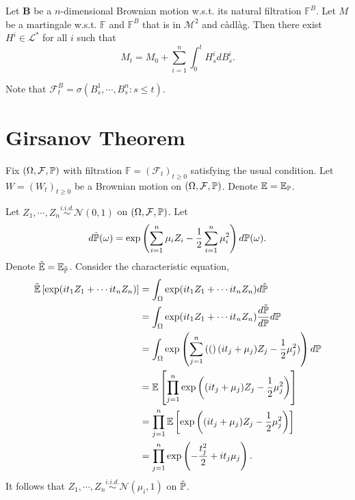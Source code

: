 \begin{thm}
    Let $\bm{B}$ be a $n$-dimensional Brownian motion w.s.t. its natural filtration $\mathbb{F}^B$. Let $M$ be a martingale w.s.t. $\mathbb{F}$ and $\mathbb{F}^B$ that is in $\mathcal{M}^2$ and c\`adl\`ag. Then there exist $H^i \in \mathcal{L}^*$ for all $i$ such that
    \begin{equation*}
        M_t = M_0 + \sum_{i=1}^n\int_0^t H_s^i dB^i_s.
    \end{equation*}
\end{thm}
\begin{rmk}
   Note that $\mathcal{F}^B_t = \sigma(B^1_s,\cdots,B^n_s \colon s \leq t)$. 
\end{rmk}

\section{Girsanov Theorem}
Fix $(\Omega,\mathcal{F},\mathbb{P})$ with filtration $\mathbb{F} = (\mathcal{F}_t)_{t \geq 0}$ satisfying the usual condition. Let $W=(W_t)_{t \geq 0}$ be a Brownian motion on $(\Omega,\mathcal{F},\mathbb{P})$. Denote $\mathbb{E} = \mathbb{E}_{\mathbb{P}}$.

\begin{exam}
    Let $Z_1,\cdots,Z_n \stackrel{i.i.d.}{\sim} \mathcal{N}(0,1)$ on $(\Omega,\mathcal{F},\mathbb{P})$. Let
    \begin{equation*}
        d\tilde{\mathbb{P}}(\omega) = \exp\left(\sum_{i=1}^n \mu_i Z_i - \frac{1}{2}\sum_{i=1}^n \mu_i^2\right) d\mathbb{P}(\omega).
    \end{equation*}
    Denote $\tilde{\mathbb{E}} = \mathbb{E}_{\tilde{\mathbb{P}}}$. Consider the characteristic equation,
    \begin{align*}
        \tilde{\mathbb{E}}\left[\exp(it_1Z_1 + \cdots it_nZ_n)\right] & = \int_\Omega \exp(it_1Z_1 + \cdots it_nZ_n) d\tilde{\mathbb{P}} \\
        &= \int_\Omega \exp(it_1Z_1 + \cdots it_nZ_n) \frac{d\tilde{\mathbb{P}}}{d\mathbb{P}} d\mathbb{P} \\
        &= \int_\Omega \exp\left(\sum_{j=1}^n \left((\right)(it_j+\mu_j)Z_j -\frac{1}{2}\mu_j^2)\right) d\mathbb{P} \\
        &= \mathbb{E}\left[\prod_{j=1}^n \exp\left((it_j+\mu_j)Z_j - \frac{1}{2}\mu_j^2\right)\right] \\
        &= \prod_{j=1}^n\mathbb{E}\left[ \exp\left((it_j+\mu_j)Z_j - \frac{1}{2}\mu_j^2\right)\right] \\
        &= \prod_{j=1}^n \exp \left(-\frac{t_j^2}{2}+i t_j \mu_j\right).
    \end{align*}
    It follows that $Z_1,\cdots,Z_n \stackrel{i.i.d.}{\sim} \mathcal{N}(\mu_i,1)$ on $\tilde{\mathbb{P}}$.
\end{exam}


